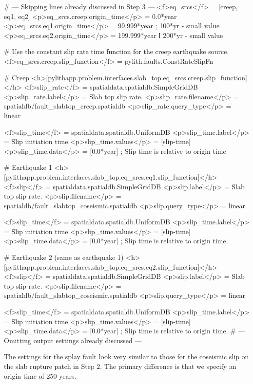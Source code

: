 \begin{cfg}
# --- Skipping lines already discussed in Step 3 ---
<f>eq_srcs</f> = [creep, eq1, eq2]
<p>eq_srcs.creep.origin_time</p> = 0.0*year
<p>eq_srcs.eq1.origin_time</p> = 99.999*year ; 100*yr - small value
<p>eq_srcs.eq2.origin_time</p> = 199.999*year l 200*yr - small value

# Use the constant slip rate time function for the creep earthquake source.
<f>eq_srcs.creep.slip_function</f> = pylith.faults.ConstRateSlipFn

# Creep
<h>[pylithapp.problem.interfaces.slab_top.eq_srcs.creep.slip_function]</h>
<f>slip_rate</f> = spatialdata.spatialdb.SimpleGridDB
<p>slip_rate.label</p> = Slab top slip rate.
<p>slip_rate.filename</p> = spatialdb/fault_slabtop_creep.spatialdb
<p>slip_rate.query_type</p> = linear

<f>slip_time</f> = spatialdata.spatialdb.UniformDB
<p>slip_time.label</p>  = Slip initiation time
<p>slip_time.values</p> = [slip-time]
<p>slip_time.data</p> = [0.0*year] ; Slip time is relative to origin time

# Earthquake 1
<h>[pylithapp.problem.interfaces.slab_top.eq_srcs.eq1.slip_function]</h>
<f>slip</f> = spatialdata.spatialdb.SimpleGridDB
<p>slip.label</p> = Slab top slip rate.
<p>slip.filename</p> = spatialdb/fault_slabtop_coseismic.spatialdb
<p>slip.query_type</p> = linear

<f>slip_time</f> = spatialdata.spatialdb.UniformDB
<p>slip_time.label</p>  = Slip initiation time
<p>slip_time.values</p> = [slip-time]
<p>slip_time.data</p> = [0.0*year] ; Slip time is relative to origin time.

# Earthquake 2 (same as earthquake 1)
<h>[pylithapp.problem.interfaces.slab_top.eq_srcs.eq2.slip_function]</h>
<f>slip</f> = spatialdata.spatialdb.SimpleGridDB
<p>slip.label</p> = Slab top slip rate.
<p>slip.filename</p> = spatialdb/fault_slabtop_coseismic.spatialdb
<p>slip.query_type</p> = linear

<f>slip_time</f> = spatialdata.spatialdb.UniformDB
<p>slip_time.label</p>  = Slip initiation time
<p>slip_time.values</p> = [slip-time]
<p>slip_time.data</p> = [0.0*year] ; Slip time is relative to origin time.
# --- Omitting output settings already discussed ---
\end{cfg}

The settings for the splay fault look very similar to those for the
coseismic slip on the slab rupture patch in Step 2. The primary
difference is that we specify an origin time of 250 years.

